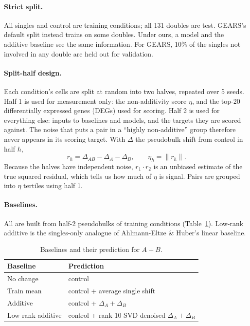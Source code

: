 \documentclass[11pt]{article}
\begin{document}
\paragraph{Strict split.} All singles and control are training conditions; all 131 doubles
are test. GEARS's default split instead trains on some doubles. Under ours, a model and the
additive baseline see the same information. For GEARS, 10\% of the singles not involved in
any double are held out for validation.

\paragraph{Split-half design.} Each condition's cells are split at random into two halves,
repeated over 5 seeds. Half 1 is used for measurement only: the non-additivity score
$\eta$, and the top-20 differentially expressed genes (DEGs) used for scoring. Half 2 is used
for everything else: inputs to baselines and models, and the targets they are scored
against. The noise that puts a pair in a ``highly non-additive'' group therefore never
appears in its scoring target. With $\Delta$ the pseudobulk shift from control in half $h$,
\begin{equation}
r_h = \Delta_{AB} - \Delta_A - \Delta_B, \qquad \eta_h = \lVert r_h \rVert .
\end{equation}
Because the halves have independent noise, $r_1 \cdot r_2$ is an unbiased estimate of the
true squared residual, which tells us how much of $\eta$ is signal. Pairs are grouped into
$\eta$ tertiles using half 1.

\paragraph{Baselines.} All are built from half-2 pseudobulks of training conditions
(Table~\ref{tab:nulls}). Low-rank additive is the singles-only analogue of
Ahlmann-Eltze \& Huber's linear baseline.

\begin{table}[h]
\centering
\caption{Baselines and their prediction for $A{+}B$.}
\label{tab:nulls}
\begin{tabular}{ll}
\toprule
Baseline & Prediction \\
\midrule
No change & control \\
Train mean & control + average single shift \\
Additive & control + $\Delta_A + \Delta_B$ \\
Low-rank additive & control + rank-10 SVD-denoised $\Delta_A + \Delta_B$ \\
\bottomrule
\end{tabular}
\end{table}
\end{document}
